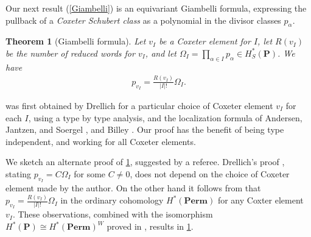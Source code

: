 \documentclass[10pt]{article}
\newtheorem{thm}{Theorem}
\numberwithin{thm}{section}
\theoremstyle{definition}
\theoremstyle{remark}
\newcommand{\Pet}{\ensuremath{\mathbf{P}}}
\newcommand{\Perm}{\ensuremath{\mathbf{Perm}}}
\begin{document}
Our next result (\cref{Giambelli})
is an equivariant Giambelli formula, %
expressing the pullback of a \emph{Coxeter Schubert class} as a polynomial in the divisor classes $p_\alpha$.
\begin{thm}[Giambelli formula]
\label{intro:Giambelli}
Let $v_I$ be a Coxeter element for $I$, 
let $R(v_I)$ be the number of reduced words for $v_I$,
and let $\Omega_I=\prod_{\alpha\in I}p_\alpha\in H^*_S(\Pet)$.
We have
\begin{align}
\label{intro:eq:Giambelli}
p_{v_I}=\frac{R(v_I)}{|I|!} \Omega_I.
\end{align}
\end{thm}

 was first obtained by Drellich \cite{drellich:monk}
for a particular choice of Coxeter element $v_I$ for each $I$,
using a type by type analysis,
and the localization formula of Andersen, Jantzen, and Soergel \cite{AJS},
and Billey \cite{billey:kostant}.
Our proof has the benefit of being type independent, and working for all Coxeter elements.

We sketch an alternate proof of \cref{intro:Giambelli}, suggested by a referee.
Drellich's proof \cite[Lemma 5.1]{drellich:monk}, stating $p_{v_I}=C \Omega_I$ for some $C\neq 0$,
does not depend on the choice of Coxeter element made by the author.
On the other hand it follows from \cite[Thm. 4]{klyachko85} that $p_{v_I}=\frac{R(v_I)}{|I|!} \Omega_I$ in the ordinary cohomology $H^*(\Perm)$ for any Coxter element $v_I$.
These observations, combined with the isomorphism $H^*(\Pet)\cong H^*(\Perm)^W$ proved in \cite{MR4116638}, results in \cref{intro:Giambelli}.
\end{document}
